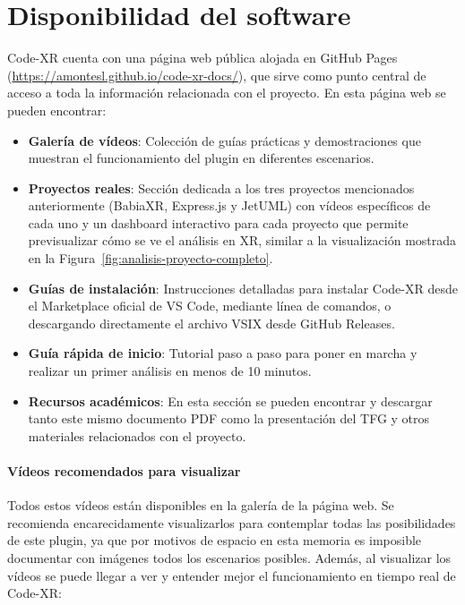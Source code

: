 \documentclass[a4paper, 12pt]{book}
\begin{document}
\section{Disponibilidad del software}
\label{sec:disponibilidad-software}

Code-XR cuenta con una página web pública alojada en GitHub Pages (\url{https://amontesl.github.io/code-xr-docs/}), que sirve como punto central de acceso a toda la información relacionada con el proyecto. En esta página web se pueden encontrar:

\begin{itemize}
  \item \textbf{Galería de vídeos}: Colección de guías prácticas y demostraciones que muestran el funcionamiento del plugin en diferentes escenarios.

  \item \textbf{Proyectos reales}: Sección dedicada a los tres proyectos mencionados anteriormente (BabiaXR, Express.js y JetUML) con vídeos específicos de cada uno y un dashboard interactivo para cada proyecto que permite previsualizar cómo se ve el análisis en XR, similar a la visualización mostrada en la Figura~\ref{fig:analisis-proyecto-completo}.

  \item \textbf{Guías de instalación}: Instrucciones detalladas para instalar Code-XR desde el Marketplace oficial de VS Code, mediante línea de comandos, o descargando directamente el archivo VSIX desde GitHub Releases.
  
  \item \textbf{Guía rápida de inicio}: Tutorial paso a paso para poner en marcha y realizar un primer análisis en menos de 10 minutos.
  
  \item \textbf{Recursos académicos}: En esta sección se pueden encontrar y descargar tanto este mismo documento PDF como la presentación del TFG y otros materiales relacionados con el proyecto.
\end{itemize}

\paragraph{Vídeos recomendados para visualizar}
Todos estos vídeos están disponibles en la galería de la página web. Se recomienda encarecidamente visualizarlos para contemplar todas las posibilidades de este plugin, ya que por motivos de espacio en esta memoria es imposible documentar con imágenes todos los escenarios posibles. Además, al visualizar los vídeos se puede llegar a ver y entender mejor el funcionamiento en tiempo real de Code-XR:
\end{document}
